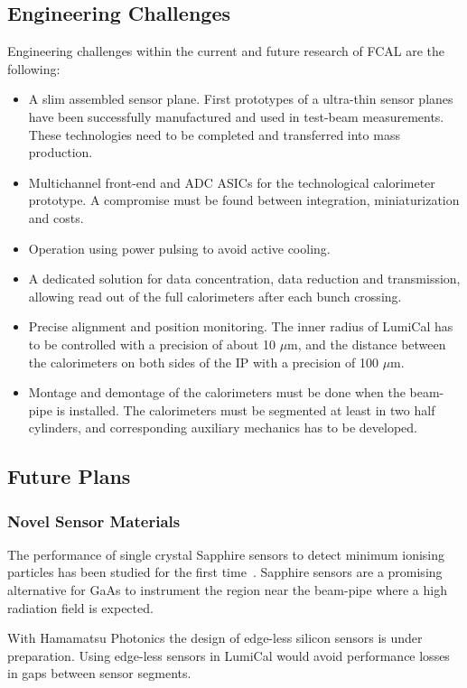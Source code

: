 \subsection{Engineering Challenges}
Engineering challenges within the current and future research of FCAL are the following:
\begin{itemize}
\item{A slim assembled sensor plane. First prototypes of a ultra-thin sensor planes have been successfully 
manufactured and used in test-beam measurements.
These technologies need to be completed and transferred into mass production. 
}
\item{Multichannel front-end and ADC ASICs for the technological calorimeter prototype.
A compromise must be found between integration, miniaturization and costs}.
\item{Operation using power pulsing to avoid active cooling}.
\item{A dedicated solution for data concentration, data reduction and transmission, allowing read out of 
the full calorimeters after each bunch crossing}.
\item{Precise alignment and position monitoring. The inner radius of LumiCal has to be controlled with a precision
of about 10 {$\mu$}m, and the distance between the 
calorimeters on both sides of the IP with a precision of 100 {$\mu$}m}.
\item{Montage and demontage of the calorimeters must be done when the beam-pipe is installed. The calorimeters must be segmented at 
least in two half cylinders, and corresponding auxiliary mechanics has to be developed.}
\end{itemize}

\subsection{Future Plans}

\subsubsection{Novel Sensor Materials}

The performance of single crystal Sapphire sensors to detect minimum ionising particles has been studied for the 
first time~\cite{1748-0221-10-08-P08008}. Sapphire sensors are a promising alternative for GaAs to instrument
the region near the beam-pipe where a high radiation field is expected.

With Hamamatsu Photonics the design of 
edge-less silicon sensors is under preparation. Using edge-less sensors in LumiCal would avoid performance losses 
in gaps between sensor segments.

